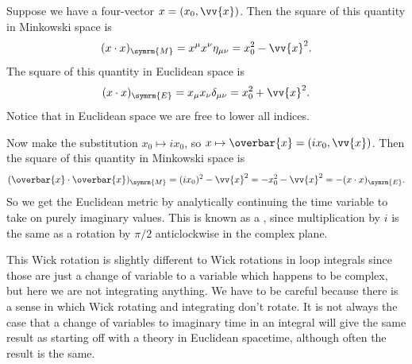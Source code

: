 \documentclass[fleqn]{NotesClass}
\newcommand{\minkowskiMetric}{\eta}
\newcommand{\minkowski}{\symrm{M}}
\newcommand{\euclidean}{\symrm{E}}
\begin{document}
    Suppose we have a four-vector \(x = (x_0, \vv{x})\).
    Then the square of this quantity in Minkowski space is
    \begin{equation}
        (x \cdot x)_{\minkowski} = x^\mu x^\nu \minkowskiMetric_{\mu\nu} = x_0^2 - \vv{x}^2.
    \end{equation}
    The square of this quantity in Euclidean space is
    \begin{equation}
        (x \cdot x)_{\euclidean} = x_\mu x_\nu \delta_{\mu\nu} = x_0^2 + \vv{x}^2.
    \end{equation}
    Notice that in Euclidean space we are free to lower all indices.
    
    Now make the substitution \(x_0 \mapsto ix_0\), so \(x \mapsto \overbar{x} =  (ix_0, \vv{x})\).
    Then the square of this quantity in Minkowski space is
    \begin{equation}
        (\overbar{x} \cdot \overbar{x})_{\minkowski} = (ix_0)^2 - \vv{x}^2 = -x_0^2 - \vv{x}^2 = -(x \cdot x)_{\euclidean}.
    \end{equation}
    So we get the Euclidean metric by analytically continuing the time variable to take on purely imaginary values.
    This is known as a , since multiplication by \(i\) is the same as a rotation by \(\pi/2\) anticlockwise in the complex plane.
    
    This Wick rotation is slightly different to Wick rotations in loop integrals since those are just a change of variable to a variable which happens to be complex, but here we are not integrating anything.
    We have to be careful because there is a sense in which Wick rotating and integrating don't rotate.
    It is not always the case that a change of variables to imaginary time in an integral will give the same result as starting off with a theory in Euclidean spacetime, although often the result is the same.
    
\end{document}
